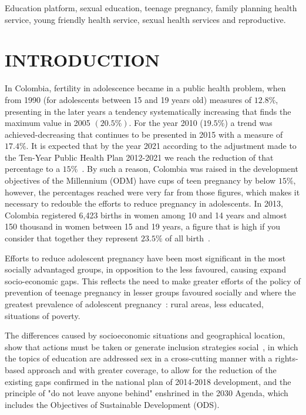 \documentclass[journal,transmag]{IEEEtran}
\begin{document}
\begin{IEEEkeywords}
Education platform, sexual education, teenage pregnancy, family planning health service, young friendly health service, sexual health services and reproductive.
\end{IEEEkeywords}

\IEEEpeerreviewmaketitle

\section{INTRODUCTION}

In Colombia, fertility in adolescence became in a public health problem, when from 1990 (for adolescents between 15 and 19 years old) measures of $12.8\%$, presenting in the later years a tendency systematically increasing that finds the maximum value in 2005 $(20.5\%)$. For the year 2010 ($19.5\%$) a trend was achieved-decreasing that continues to be presented in 2015 with a measure of $17.4\%$. It is expected that by the year 2021 according to the adjustment made to the Ten-Year Public Health Plan 2012-2021 we reach the reduction of that percentage to a $15\%$~\cite{Pro2015}. By such a reason, Colombia was raised in the development objectives of the Millennium (ODM) have cups of teen pregnancy by below $15\%$, however, the percentages reached were very far from those figures, which makes it necessary to redouble the efforts to reduce pregnancy in adolescents. In 2013, Colombia registered 6,423 births in women among 10 and 14 years and almost 150 thousand in women between 15 and 19 years, a figure that is high if you consider that together they represent $23.5\%$ of all birth~\cite{PNUD2015}.

Efforts to reduce adolescent pregnancy have been most significant in the most socially advantaged groups, in opposition to the less favoured, causing expand socio-economic gaps. This reflects the need to make greater efforts of the policy of prevention of teenage pregnancy in lesser groups favoured socially and where the greatest prevalence of adolescent pregnancy~\cite{Pro2015, Pro2015II}: rural areas, less educated, situations of poverty.

The differences caused by socioeconomic situations and geographical location, show that actions must be taken or generate inclusion strategies social~\cite{BID2017}, in which the topics of education are addressed sex in a cross-cutting manner with a rights-based approach and with greater coverage, to allow for the reduction of the existing gaps confirmed in the national plan of 2014-2018 development, and the principle of "do not leave anyone behind" enshrined in the 2030 Agenda, which includes the Objectives of Sustainable Development (ODS).
\end{document}
